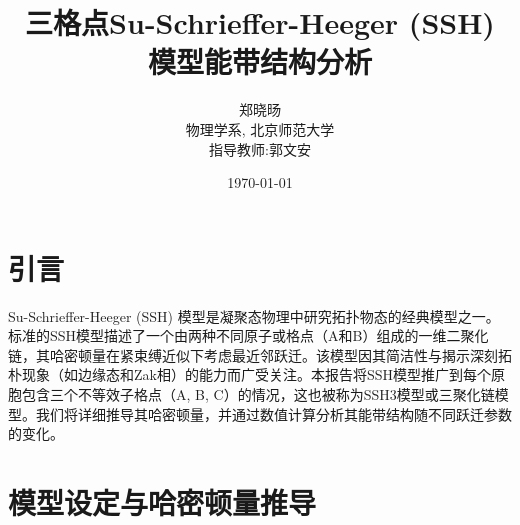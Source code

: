 \documentclass[UTF-8]{ctexart}
\title{三格点Su-Schrieffer-Heeger (SSH) 模型能带结构分析}
\author{郑晓旸\\
        物理学系, 北京师范大学\\
        指导教师:郭文安}
\date{\today}
\begin{document}
\maketitle
\thispagestyle{fancy}

\section{引言}
Su-Schrieffer-Heeger (SSH) 模型是凝聚态物理中研究拓扑物态的经典模型之一。标准的SSH模型描述了一个由两种不同原子或格点（A和B）组成的一维二聚化链，其哈密顿量在紧束缚近似下考虑最近邻跃迁。该模型因其简洁性与揭示深刻拓朴现象（如边缘态和Zak相）的能力而广受关注。本报告将SSH模型推广到每个原胞包含三个不等效子格点（A, B, C）的情况，这也被称为SSH3模型或三聚化链模型。我们将详细推导其哈密顿量，并通过数值计算分析其能带结构随不同跃迁参数的变化。
\section{模型设定与哈密顿量推导}
\end{document}
